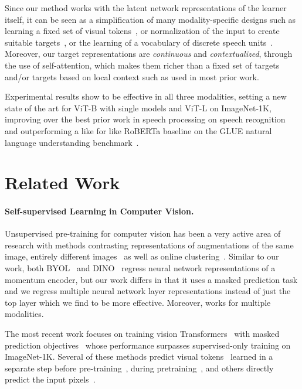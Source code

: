 \documentclass[nohyperref]{article}
\theoremstyle{plain}
\theoremstyle{definition}
\theoremstyle{remark}
\begin{document}
Since our method works with the latent network representations of the learner itself, it can be seen as a simplification of many modality-specific designs such as learning a fixed set of visual tokens~\citep{radford2021clip,oord2017vqvae}, or normalization of the input to create suitable targets~\citep{he2021mae}, or the learning of a vocabulary of discrete speech units~\citep{baevski2020wav,hsu2020hubert}. 
Moreover, our target representations are \emph{continuous} and \emph{contextualized}, through the use of self-attention, which makes them richer than a fixed set of targets and/or targets based on local context such as used in most prior work.

Experimental results show \name{} to be effective in all three modalities, setting a new state of the art for ViT-B with single models and ViT-L on ImageNet-1K, improving over the best prior work in speech processing on speech recognition~\citep{baevski2020wav,hsu2020hubert} and outperforming a like for like RoBERTa baseline on the GLUE natural language understanding benchmark~\citep{liu2019roberta}.

\section{Related Work}
\label{sec:related}

\paragraph{Self-supervised Learning in Computer Vision.}
Unsupervised pre-training for computer vision has been a very active area of research with methods contrasting representations of augmentations of the same image, entirely different images~\citep{chen2020simple,grill2020byol,caron2021dino,chen2021mocov3} as well as online clustering~\citep{caron2020swav}.
Similar to our work, both BYOL~\citep{grill2020byol} and DINO~\citep{caron2021dino} regress neural network representations of a momentum encoder, but our work differs in that it uses a masked prediction task and we regress multiple neural network layer representations instead of just the top layer which we find to be more effective.
Moreover, \name{} works for multiple modalities.

The most recent work focuses on training vision Transformers~\citep{dosovitskiy2020vit} with masked prediction objectives~\citep{bao2021beit,he2021mae,xie2021simmim} whose performance surpasses supervised-only training on ImageNet-1K.
Several of these methods predict visual tokens~\citep{bao2021beit,he2021mae,dong2022peco} learned in a separate step before pre-training~\citep{oord2017vqvae,ramesh2021zero}, during pretraining~\citep{zhou2021ibot}, and others directly predict the input pixels~\citep{he2021mae,xie2021simmim}.
\end{document}
